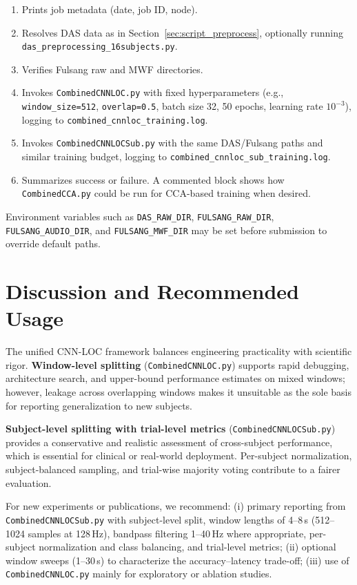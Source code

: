 \documentclass[11pt,a4paper]{article}
\newcommand{\py}[1]{\texttt{#1}}
\begin{document}
\begin{enumerate}
  \item Prints job metadata (date, job ID, node).
  \item Resolves DAS data as in Section~\ref{sec:script_preprocess}, optionally running \py{das\_preprocessing\_16subjects.py}.
  \item Verifies Fulsang raw and MWF directories.
  \item Invokes \py{CombinedCNNLOC.py} with fixed hyperparameters (e.g., \texttt{window\_size=512}, \texttt{overlap=0.5}, batch size 32, 50 epochs, learning rate $10^{-3}$), logging to \py{combined\_cnnloc\_training.log}.
  \item Invokes \py{CombinedCNNLOCSub.py} with the same DAS/Fulsang paths and similar training budget, logging to \py{combined\_cnnloc\_sub\_training.log}.
  \item Summarizes success or failure. A commented block shows how \py{CombinedCCA.py} could be run for CCA-based training when desired.
\end{enumerate}

Environment variables such as \texttt{DAS\_RAW\_DIR}, \texttt{FULSANG\_RAW\_DIR}, \texttt{FULSANG\_AUDIO\_DIR}, and \texttt{FULSANG\_MWF\_DIR} may be set before submission to override default paths.

\section{Discussion and Recommended Usage}
\label{sec:discussion}

The unified CNN-LOC framework balances engineering practicality with scientific rigor. \textbf{Window-level splitting} (\py{CombinedCNNLOC.py}) supports rapid debugging, architecture search, and upper-bound performance estimates on mixed windows; however, leakage across overlapping windows makes it unsuitable as the sole basis for reporting generalization to new subjects.

\textbf{Subject-level splitting with trial-level metrics} (\py{CombinedCNNLOCSub.py}) provides a conservative and realistic assessment of cross-subject performance, which is essential for clinical or real-world deployment. Per-subject normalization, subject-balanced sampling, and trial-wise majority voting contribute to a fairer evaluation.

For new experiments or publications, we recommend: (i) primary reporting from \py{CombinedCNNLOCSub.py} with subject-level split, window lengths of 4--8\,s (512--1024 samples at 128\,Hz), bandpass filtering 1--40\,Hz where appropriate, per-subject normalization and class balancing, and trial-level metrics; (ii) optional window sweeps (1--30\,s) to characterize the accuracy--latency trade-off; (iii) use of \py{CombinedCNNLOC.py} mainly for exploratory or ablation studies.
\end{document}
